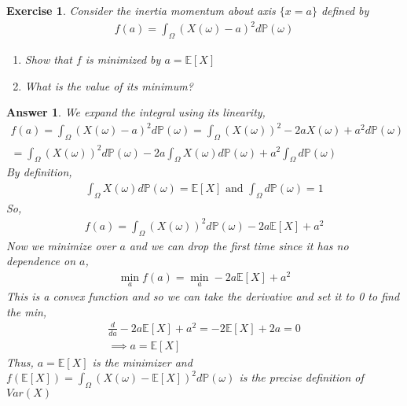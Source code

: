 \documentclass[12pt]{article}
\theoremstyle{colon}
\newtheorem{exercise}{Exercise}
\newtheorem*{answer}{Answer}
\begin{document}
\clearpage

\begin{exercise}
  Consider the inertia momentum about axis $\{ x = a \}$ defined by
  \begin{gather*}
    f(a) = \int_\Omega (X(\omega) - a)^2 d\mathbb{P}(\omega)
  \end{gather*}
  \begin{enumerate}[label=\roman*)]
    \item Show that $f$ is minimized by $a = \mathbb{E}[X]$
    \item What is the value of its minimum?
  \end{enumerate}
\end{exercise}

\begin{answer}
  We expand the integral using its linearity,
  \begin{gather*}
    f(a) = \int_\Omega (X(\omega) - a)^2 d\mathbb{P}(\omega) = \int_\Omega \left(X(\omega)\right)^2 -2aX(\omega) + a^2 d\mathbb{P}(\omega) \\
    = \int_\Omega \left(X(\omega)\right)^2 d\mathbb{P}(\omega) -2a \int_\Omega X(\omega)d\mathbb{P}(\omega) + a^2 \int_\Omega d\mathbb{P}(\omega)
  \end{gather*}
  By definition,
  \begin{gather*}
    \int_\Omega X(\omega)d\mathbb{P}(\omega) = \mathbb{E}[X] \text{ and } \int_\Omega d\mathbb{P}(\omega) = 1
  \end{gather*}
  So,
  \begin{gather*}
    f(a) = \int_\Omega \left(X(\omega)\right)^2 d\mathbb{P}(\omega) -2a\mathbb{E}[X] + a^2
  \end{gather*}
  Now we minimize over $a$ and we can drop the first time since it has no dependence on $a$,
  \begin{gather*}
    \min_a f(a) = \min_a -2a\mathbb{E}[X] + a^2
  \end{gather*}
  This is a convex function and so we can take the derivative and set it to 0 to find the min,
  \begin{gather*}
    \frac{d}{da} -2a\mathbb{E}[X] + a^2 = -2\mathbb{E}[X] + 2a =0 \\
    \implies a = \mathbb{E}[X]
  \end{gather*}
  Thus, $a = \mathbb{E}[X]$ is the minimizer and $f(\mathbb{E}[X]) = \int_\Omega (X(\omega) - \mathbb{E}[X])^2 d\mathbb{P}(\omega)$ is the precise definition of $Var(X)$
\end{answer}
\end{document}
